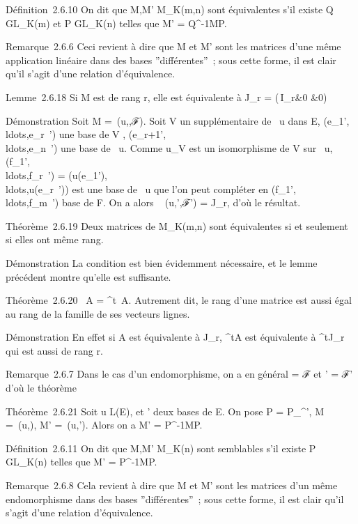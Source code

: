 \documentclass[]{article}
\begin{document}
Définition~2.6.10 On dit que M,M' \in M\_K(m,n) sont équivalentes
s'il existe Q \in GL\_K(m) et P \in GL\_K(n) telles que M' =
Q^-1MP.

Remarque~2.6.6 Ceci revient à dire que M et M' sont les matrices d'une
même application linéaire dans des bases ''différentes''~; sous cette
forme, il est clair qu'il s'agit d'une relation d'équivalence.

Lemme~2.6.18 Si M est de rang r, elle est équivalente à J\_r =
\left
(\matrix\,I\_r&0
 &0\right )

Démonstration Soit M =\
\mathrmMat (u,,ℱ). Soit V un supplémentaire de
\mathrmKer~u dans E,
(e\_1',\\ldots,e\_r~')
une base de V ,
(e\_r+1',\\ldots,e\_n~')
une base de \mathrmKer~u.
Comme u\textbar{}\_V  est un isomorphisme de V sur
\mathrmIm~u,
(f\_1',\\ldots,f\_r~')
=
(u(e\_1'),\\ldots,u(e\_r~'))
est une base de \mathrmIm~u
que l'on peut compléter en
(f\_1',\\ldots,f\_m~')
base de F. On a alors
\mathrmMat~ (u,',ℱ') =
J\_r, d'où le résultat.

Théorème~2.6.19 Deux matrices de M\_K(m,n) sont équivalentes si
et seulement si elles ont même rang.

Démonstration La condition est bien évidemment nécessaire, et le lemme
précédent montre qu'elle est suffisante.

Théorème~2.6.20 \mathrmrg~A
= \mathrmrg^t~A.
Autrement dit, le rang d'une matrice est aussi égal au rang de la
famille de ses vecteurs lignes.

Démonstration En effet si A est équivalente à J\_r,
^tA est équivalente à ^tJ\_r qui est aussi
de rang r.

Remarque~2.6.7 Dans le cas d'un endomorphisme, on a en général  = ℱ et
\mathcal{E}' = ℱ' d'où le théorème

Théorème~2.6.21 Soit u \in L(E),  et ' deux bases de E. On pose P =
P\_\mathcal{E}^\mathcal{E}', M =\
\mathrmMat (u,), M' =\
\mathrmMat (u,\mathcal{E}'). Alors on a M' =
P^-1MP.

Définition~2.6.11 On dit que M,M' \in M\_K(n) sont semblables s'il
existe P \in GL\_K(n) telles que M' = P^-1MP.

Remarque~2.6.8 Cela revient à dire que M et M' sont les matrices d'un
même endomorphisme dans des bases ''différentes''~; sous cette forme, il
est clair qu'il s'agit d'une relation d'équivalence.
\end{document}
